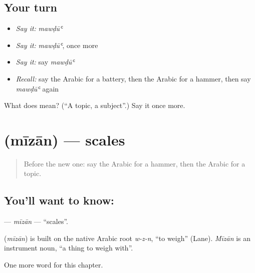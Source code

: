 \subsection*{Your turn}
\begin{itemize}
\raggedright
  \item \emph{Say it:} \emph{mawḍūʿ}
  \item \emph{Say it:} \emph{mawḍūʿ}, once more
  \item \emph{Say it:} say \emph{mawḍūʿ}
  \item \emph{Recall:} say the Arabic for a battery, then the Arabic for a hammer, then say \emph{mawḍūʿ} again
\end{itemize}

\begin{tcolorbox}[breakable,colback=teal!4,colframe=teal!35!black,title={Before you move on}]
What does  mean? (\textquotedblleft{}A topic, a subject\textquotedblright{}.) Say it once more.
\end{tcolorbox}
\section[\texorpdfstring{\ar{ميزان} (mīzān)}{ميزان (mīzān)}]{ (mīzān) — scales}

\label{lesson:AR-C218-mizan}



\begin{quote}
Before the new one: say the Arabic for a hammer, then the Arabic for a topic.
\end{quote}

\subsection*{You'll want to know: }
\textbf{} — \emph{mīzān} — \textquotedblleft{}scales\textquotedblright{}.

\begin{cousinweb}
\textbf{} (\emph{mīzān}) is built on the native Arabic root \emph{w-z-n}, \textquotedblleft{}to weigh\textquotedblright{} (Lane). \emph{Mīzān} is an instrument noun, \textquotedblleft{}a thing to weigh with\textquotedblright{}.
\end{cousinweb}

\begin{grammarlens}[title={What you've built}]
One more word for this chapter.
\end{grammarlens}

